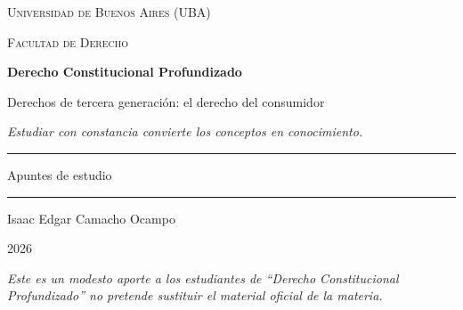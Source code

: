 \documentclass[12pt,oneside]{book}
\newcommand{\universidad}{Universidad de Buenos Aires (UBA)}
\newcommand{\facultad}{Facultad de Derecho}
\newcommand{\materia}{Derecho Constitucional Profundizado}
\newcommand{\titulo}{Derechos de tercera generaci\'on: el derecho del consumidor}
\newcommand{\autor}{Isaac Edgar Camacho Ocampo}
\newcommand{\anio}{2026}
\begin{document}
\begin{titlepage}

\thispagestyle{empty}

\begin{center}

\vspace*{1cm}

{\large \textsc{\universidad}}

\vspace{0.2cm}

{\large \textsc{\facultad}}

\vspace{3cm}

{\Huge \textbf{\materia}}

\vspace{1cm}

{\LARGE \titulo}

\vspace{0.8cm}

\textit{Estudiar con constancia convierte los conceptos en conocimiento.}

\vspace{1.2cm}

\rule{0.70\textwidth}{0.5pt}

\vspace{0.5cm}

{\large Apuntes de estudio}

\vspace{0.5cm}

\rule{0.70\textwidth}{0.5pt}

\vfill

{\large \autor}

\vspace{0.3cm}

{\large \anio}

\end{center}

\vfill

\begin{flushleft}
\textit{Este es un modesto aporte a los estudiantes de ``\materia'' no pretende sustituir el material oficial de la materia.}
\end{flushleft}

\end{titlepage}

\tableofcontents
\end{document}
